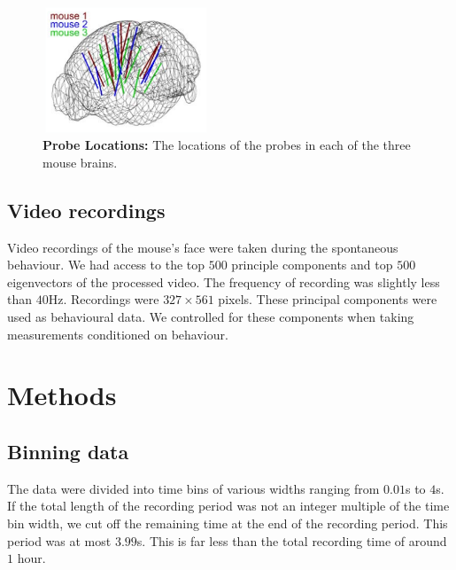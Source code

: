\documentclass[a4paper,12pt]{article}
\theoremstyle{definition}
\begin{document}
    \begin{figure}[h]
        \centering
        \includegraphics[width=5cm,height=3.75cm]{figures/probe_locations_stringer.png}
        \caption{\textbf{Probe Locations:} The locations of the probes in each of the three mouse brains\cite{stringer}.}
        \label{fig:probe_locations}
    \end{figure}

    \subsection{Video recordings}\label{sec:video_recordings}
    Video recordings of the mouse's face were taken during the spontaneous behaviour. We had access to the top $500$ principle components and top $500$ eigenvectors of the processed video. The frequency of recording was slightly less than $40$Hz. Recordings were $327 \times 561$ pixels. These principal components were used as behavioural data. We controlled for these components when taking measurements conditioned on behaviour. 

\section{Methods}
    \subsection{Binning data}
    The data were divided into time bins of various widths ranging from $0.01$s to $4$s. If the total length of the recording period was not an integer multiple of the time bin width, we cut off the remaining time at the end of the recording period. This period was at most $3.99$s. This is far less than the total recording time of around $1$ hour.
\end{document}
